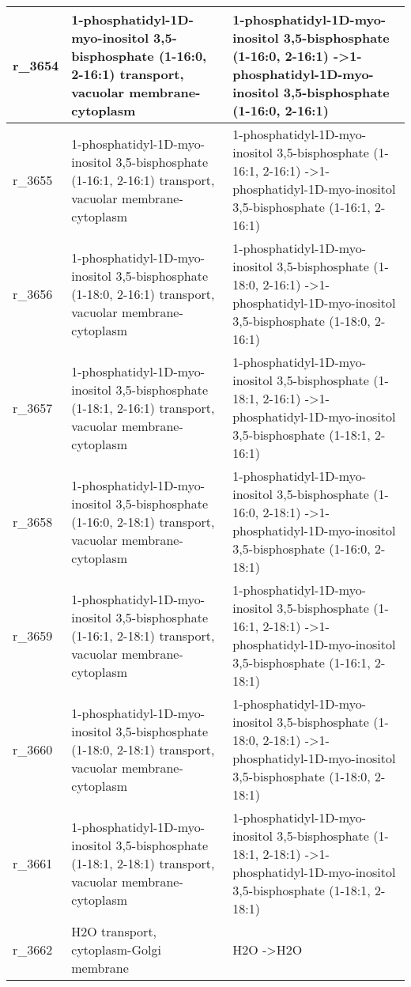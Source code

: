 \begin{landscape}
{\begin{longtable}{|l|p{7cm}|p{15cm}|}
r\_3654 & 1-phosphatidyl-1D-myo-inositol 3,5-bisphosphate (1-16:0, 2-16:1) transport, vacuolar membrane-cytoplasm & 1-phosphatidyl-1D-myo-inositol 3,5-bisphosphate (1-16:0, 2-16:1)  -\textgreater 1-phosphatidyl-1D-myo-inositol 3,5-bisphosphate (1-16:0, 2-16:1) \\ \hline
r\_3655 & 1-phosphatidyl-1D-myo-inositol 3,5-bisphosphate (1-16:1, 2-16:1) transport, vacuolar membrane-cytoplasm & 1-phosphatidyl-1D-myo-inositol 3,5-bisphosphate (1-16:1, 2-16:1)  -\textgreater 1-phosphatidyl-1D-myo-inositol 3,5-bisphosphate (1-16:1, 2-16:1) \\ \hline
r\_3656 & 1-phosphatidyl-1D-myo-inositol 3,5-bisphosphate (1-18:0, 2-16:1) transport, vacuolar membrane-cytoplasm & 1-phosphatidyl-1D-myo-inositol 3,5-bisphosphate (1-18:0, 2-16:1)  -\textgreater 1-phosphatidyl-1D-myo-inositol 3,5-bisphosphate (1-18:0, 2-16:1) \\ \hline
r\_3657 & 1-phosphatidyl-1D-myo-inositol 3,5-bisphosphate (1-18:1, 2-16:1) transport, vacuolar membrane-cytoplasm & 1-phosphatidyl-1D-myo-inositol 3,5-bisphosphate (1-18:1, 2-16:1)  -\textgreater 1-phosphatidyl-1D-myo-inositol 3,5-bisphosphate (1-18:1, 2-16:1) \\ \hline
r\_3658 & 1-phosphatidyl-1D-myo-inositol 3,5-bisphosphate (1-16:0, 2-18:1) transport, vacuolar membrane-cytoplasm & 1-phosphatidyl-1D-myo-inositol 3,5-bisphosphate (1-16:0, 2-18:1)  -\textgreater 1-phosphatidyl-1D-myo-inositol 3,5-bisphosphate (1-16:0, 2-18:1) \\ \hline
r\_3659 & 1-phosphatidyl-1D-myo-inositol 3,5-bisphosphate (1-16:1, 2-18:1) transport, vacuolar membrane-cytoplasm & 1-phosphatidyl-1D-myo-inositol 3,5-bisphosphate (1-16:1, 2-18:1)  -\textgreater 1-phosphatidyl-1D-myo-inositol 3,5-bisphosphate (1-16:1, 2-18:1) \\ \hline
r\_3660 & 1-phosphatidyl-1D-myo-inositol 3,5-bisphosphate (1-18:0, 2-18:1) transport, vacuolar membrane-cytoplasm & 1-phosphatidyl-1D-myo-inositol 3,5-bisphosphate (1-18:0, 2-18:1)  -\textgreater 1-phosphatidyl-1D-myo-inositol 3,5-bisphosphate (1-18:0, 2-18:1) \\ \hline
r\_3661 & 1-phosphatidyl-1D-myo-inositol 3,5-bisphosphate (1-18:1, 2-18:1) transport, vacuolar membrane-cytoplasm & 1-phosphatidyl-1D-myo-inositol 3,5-bisphosphate (1-18:1, 2-18:1)  -\textgreater 1-phosphatidyl-1D-myo-inositol 3,5-bisphosphate (1-18:1, 2-18:1) \\ \hline
r\_3662 & H2O transport, cytoplasm-Golgi membrane & H2O  -\textgreater H2O \\ \hline

\end{longtable}}
\end{landscape}
